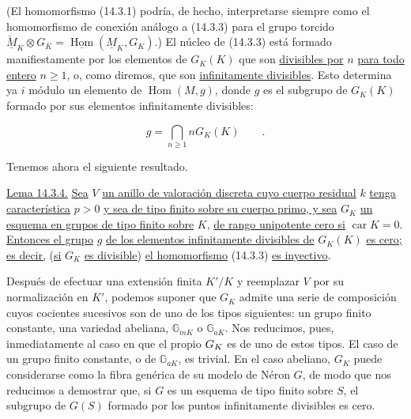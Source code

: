 
(El homomorfismo (14.3.1) podría, de hecho, interpretarse siempre como
el homomorfismo de conexión análogo a (14.3.3) para el grupo torcido
$\check{\underline M}_K\otimes G_K=
\underline{\operatorname{Hom}}(\underline M_K,G_K)$.) El núcleo de
(14.3.3) está formado manifiestamente por los elementos de $G_K(K)$ que
son \underline{divisibles por} $n$ \underline{para todo entero}
$n\geq1$, o, como diremos, que son \underline{infinitamente
divisibles}. Esto determina ya $i$ módulo un elemento de
$\operatorname{Hom}(M,g)$, donde $g$ es el subgrupo de $G_K(K)$ formado
por sus elementos infinitamente divisibles:

\begin{equation*}
 g=\bigcap_{n\geq1}nG_K(K)\qquad .
\end{equation*}

Tenemos ahora el siguiente resultado.

\medskip
\noindent
\underline{Lema 14.3.4.} \underline{Sea} $V$ \underline{un anillo de
valoración discreta cuyo cuerpo residual} $k$ \underline{tenga
característica} $p>0$ \underline{y sea de tipo finito sobre su cuerpo
primo, y sea} $G_K$ \underline{un esquema en grupos de tipo finito
sobre} $K$, \underline{de rango unipotente cero si}
$\operatorname{car}K=0$. \underline{Entonces el grupo} $g$
\underline{de los elementos infinitamente divisibles de} $G_K(K)$
\underline{es cero; es decir,} (\underline{si} $G_K$ \underline{es
divisible}) \underline{el homomorfismo} (14.3.3) \underline{es
inyectivo}.

Después de efectuar una extensión finita $K'/K$ y reemplazar $V$ por
su normalización en $K'$, podemos suponer que $G_K$ admite una serie de
composición cuyos cocientes sucesivos son de uno de los tipos
siguientes: un grupo finito constante, una variedad abeliana,
$\mathbb G_{mK}$ o $\mathbb G_{aK}$. Nos reducimos, pues,
inmediatamente al caso en que el propio $\sisi{\mathbb G_K}{G_K}$ es
de uno de estos tipos. El caso de un grupo finito constante, o de
$\mathbb G_{aK}$, es trivial. En el caso abeliano, $G_K$ puede
considerarse como la fibra genérica de su modelo de Néron $G$, de modo
que nos reducimos a demostrar que, si $G$ es un esquema de tipo finito
sobre $S$, el subgrupo de $G(S)$ formado por los puntos infinitamente
divisibles es cero.


